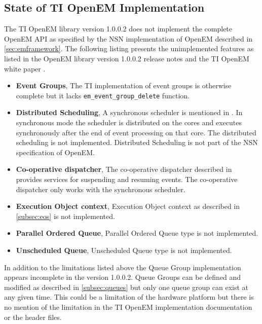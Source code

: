 \subsection{State of TI OpenEM Implementation}
The TI OpenEM library version 1.0.0.2 does not implement the complete OpenEM API as specified by the NSN implementation of OpenEM described in \ref{sec:emframework}. The following listing presents the unimplemented features as listed in the OpenEM library version 1.0.0.2 release notes \cite{openemnotes} and the TI OpenEM white paper \cite{openemwhite}.

\begin{itemize}
    \item \textbf{Event Groups},
        The TI implementation of event groups is otherwise complete but it lacks \texttt{em\_event\_group\_delete} function.
    \item \textbf{Distributed Scheduling},
        A synchronous scheduler is mentioned in \cite{openemwhite}. In synchronous mode the scheduler is distributed on the cores and executes synchronously after the end of event processing on that core. The distributed scheduling is not implemented. Distributed Scheduling is not part of the NSN specification of OpenEM.
    \item \textbf{Co-operative dispatcher},
        The co-operative dispatcher described in \cite{openemwhite} provides services for suspending and resuming events. The co-operative dispatcher only works with the synchronous scheduler.
    \item \textbf{Execution Object context},
        Execution Object context as described in \ref{subsec:eos} is not implemented.
    \item \textbf{Parallel Ordered Queue},
        Parallel Ordered Queue type is not implemented.
    \item \textbf{Unscheduled Queue},
        Unscheduled Queue type is not implemented.
\end{itemize}

In addition to the limitations listed above the Queue Group implementation appears incomplete in the version 1.0.0.2. Queue Groups can be defined and modified as described in \ref{subsec:queues} but only one queue group can exist at any given time. This could be a limitation of the hardware platform but there is no mention of the limitation in the TI OpenEM implementation documentation or the header files.

